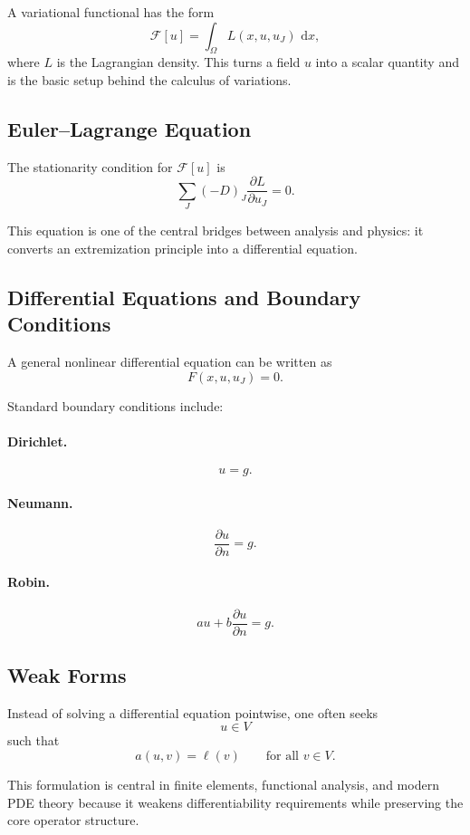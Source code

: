 \documentclass[11pt]{article}
\newcommand{\dd}{\,\mathrm{d}}
\newcommand{\pd}[2]{\frac{\partial #1}{\partial #2}}
\begin{document}
A variational functional has the form
\[
  \mathcal{F}[u]
  =
  \int_\Omega
  L(x,u,u_J)\,\dd x,
\]
where \(L\) is the Lagrangian density. This turns a field \(u\) into a scalar
quantity and is the basic setup behind the calculus of variations.

\subsection{Euler--Lagrange Equation}

The stationarity condition for \(\mathcal{F}[u]\) is
\[
  \sum_J
  (-D)_J
  \frac{\partial L}{\partial u_J}
  = 0.
\]

This equation is one of the central bridges between analysis and physics: it
converts an extremization principle into a differential equation.

\subsection{Differential Equations and Boundary Conditions}

A general nonlinear differential equation can be written as
\[
  F(x,u,u_J) = 0.
\]

Standard boundary conditions include:

\paragraph{Dirichlet.}
\[
  u = g.
\]

\paragraph{Neumann.}
\[
  \pd{u}{n} = g.
\]

\paragraph{Robin.}
\[
  au + b \pd{u}{n} = g.
\]

\subsection{Weak Forms}

Instead of solving a differential equation pointwise, one often seeks
\[
  u \in V
\]
such that
\[
  a(u,v) = \ell(v)
  \qquad
  \text{for all } v \in V.
\]

This formulation is central in finite elements, functional analysis, and modern
PDE theory because it weakens differentiability requirements while preserving
the core operator structure.
\end{document}
